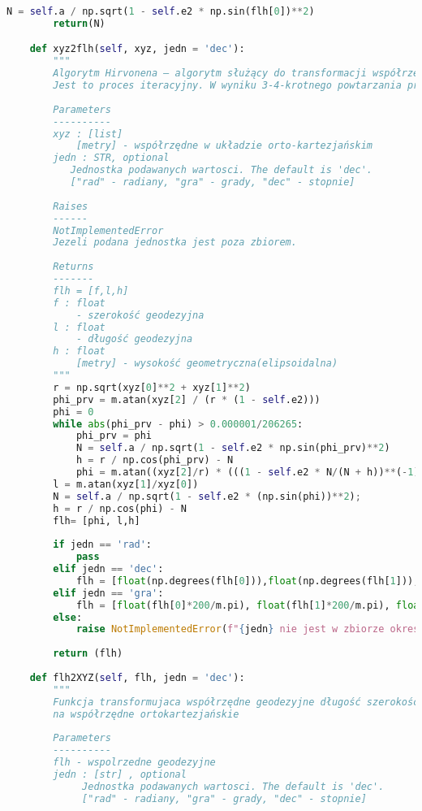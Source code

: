 \begin{lstlisting}[caption={\emph{Treść programu}}, language=Python]
        N = self.a / np.sqrt(1 - self.e2 * np.sin(flh[0])**2)
        return(N)

    def xyz2flh(self, xyz, jedn = 'dec'):
        """
        Algorytm Hirvonena – algorytm służący do transformacji współrzędnych ortokartezjańskich (prostokątnych) x, y, z na współrzędne geodezyjne B, L, h.
        Jest to proces iteracyjny. W wyniku 3-4-krotnego powtarzania procedury można przeliczyć współrzędne na poziomie dokładności 1 cm.
        
        Parameters
        ----------
        xyz : [list]
            [metry] - współrzędne w układzie orto-kartezjańskim
        jedn : STR, optional
           Jednostka podawanych wartosci. The default is 'dec'.
           ["rad" - radiany, "gra" - grady, "dec" - stopnie]
        
        Raises
        ------
        NotImplementedError
        Jezeli podana jednostka jest poza zbiorem.
       
        Returns
        -------
        flh = [f,l,h]
        f : float
            - szerokość geodezyjna
        l : float
            - długość geodezyjna
        h : float
            [metry] - wysokość geometryczna(elipsoidalna)
        """
        r = np.sqrt(xyz[0]**2 + xyz[1]**2)
        phi_prv = m.atan(xyz[2] / (r * (1 - self.e2)))
        phi = 0
        while abs(phi_prv - phi) > 0.000001/206265:    
            phi_prv = phi
            N = self.a / np.sqrt(1 - self.e2 * np.sin(phi_prv)**2)
            h = r / np.cos(phi_prv) - N
            phi = m.atan((xyz[2]/r) * (((1 - self.e2 * N/(N + h))**(-1))))
        l = m.atan(xyz[1]/xyz[0])
        N = self.a / np.sqrt(1 - self.e2 * (np.sin(phi))**2);
        h = r / np.cos(phi) - N
        flh= [phi, l,h]
        
        if jedn == 'rad':
            pass
        elif jedn == 'dec':
            flh = [float(np.degrees(flh[0])),float(np.degrees(flh[1])),float(flh[2])]
        elif jedn == 'gra':
            flh = [float(flh[0]*200/m.pi), float(flh[1]*200/m.pi), float(flh[2])]
        else:
            raise NotImplementedError(f"{jedn} nie jest w zbiorze okreslen")
            
        return (flh)
   
    def flh2XYZ(self, flh, jedn = 'dec'):
        """
        Funkcja transformujaca współrzędne geodezyjne długość szerokość i wysokośc elipsoidalna 
        na współrzędne ortokartezjańskie
        
        Parameters
        ----------
        flh - wspolrzedne geodezyjne
        jedn : [str] , optional
             Jednostka podawanych wartosci. The default is 'dec'.
             ["rad" - radiany, "gra" - grady, "dec" - stopnie]
        

\end{lstlisting}
